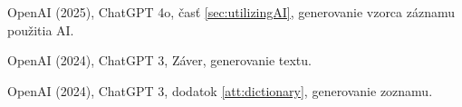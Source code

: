 \begin{trivlist}
\item OpenAI (2025), ChatGPT 4o, časť \ref{sec:utilizingAI}, generovanie vzorca záznamu použitia AI.

\item OpenAI (2024), ChatGPT 3, Záver, generovanie textu.

\item OpenAI (2024), ChatGPT 3, dodatok \ref{att:dictionary}, generovanie zoznamu.
\end{trivlist}
